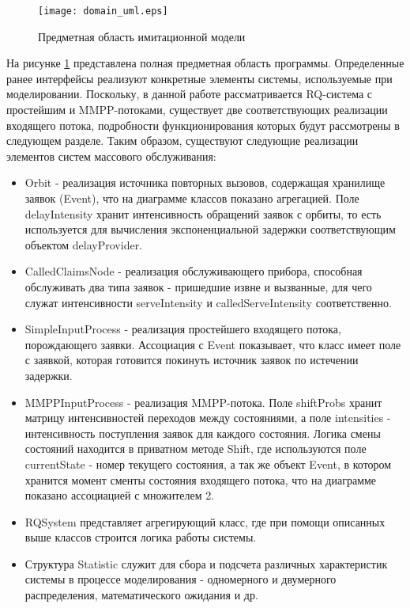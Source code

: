 \begin{figure}[H]
	\centering
	\texttt{[image: domain\_uml.eps]}
	\caption{Предметная область имитационной модели}
	\label{domain_uml}
\end{figure}
На рисунке \ref{domain_uml} представлена полная предметная область программы. Определенные ранее интерфейсы реализуют конкретные элементы системы, используемые при моделировании. Поскольку, в данной работе рассматривается RQ-система с простейшим и MMPP-потоками, существует две соответствующих реализации входящего потока, подробности функционирования которых будут рассмотрены в следующем разделе. Таким образом, существуют следующие реализации элементов систем массового обслуживания:
\begin{itemize}
	\item Orbit - реализация источника повторных вызовов, содержащая хранилище заявок (Event), что на диаграмме классов показано агрегацией. Поле delayIntensity хранит интенсивность обращений заявок с орбиты, то есть используется для вычисления экспоненциальной задержки соответствующим объектом delayProvider.
	\item CalledClaimsNode - реализация обслуживающего прибора, способная обслуживать два типа заявок - пришедшие извне и вызванные, для чего служат интенсивности serveIntensity и calledServeIntensity соответственно.
	\item SimpleInputProcess - реализация простейшего входящего потока, порождающего заявки. Ассоциация с Event показывает, что класс имеет поле с заявкой, которая готовится покинуть источник заявок по истечении задержки.
	\item MMPPInputProcess - реализация MMPP-потока. Поле shiftProbs хранит матрицу интенсивностей переходов между состояниями, а поле intensities - интенсивность поступления заявок для каждого состояния. Логика смены состояний находится в приватном методе Shift, где используются поле currentState - номер текущего состояния, а так же объект Event, в котором хранится момент сменты состояния входящего потока, что на диаграмме показано ассоциацией с множителем 2.
	\item RQSystem представляет агрегирующий класс, где при помощи описанных выше классов строится логика работы системы.
	\item Структура Statistic служит для сбора и подсчета различных характеристик системы в процессе моделирования - одномерного и двумерного распределения, математического ожидания и др. 
\end{itemize}
\clearpage

